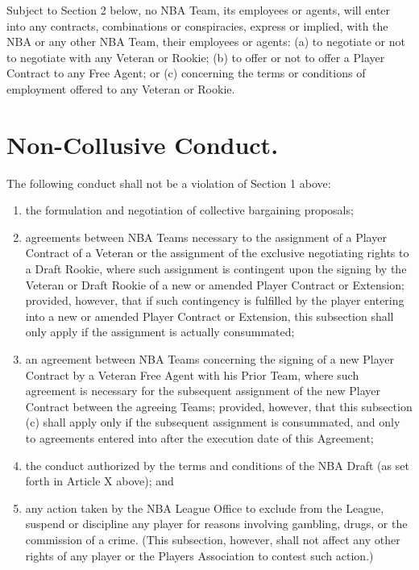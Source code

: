 \documentclass[
]{book}
\providecommand{\tightlist}{%
  \setlength{\itemsep}{0pt}\setlength{\parskip}{0pt}}
\begin{document}
Subject to Section 2 below, no NBA Team, its employees or agents, will enter into any contracts, combinations or conspiracies, express or implied, with the NBA or any other NBA Team, their employees or agents: (a) to negotiate or not to negotiate with any Veteran or Rookie; (b) to offer or not to offer a Player Contract to any Free Agent; or (c) concerning the terms or conditions of employment offered to any Veteran or Rookie.

\hypertarget{non-collusive-conduct.}{%
\section{Non-Collusive Conduct.}\label{non-collusive-conduct.}}

The following conduct shall not be a violation of Section 1 above:

\begin{enumerate}
\def\labelenumi{(\alph{enumi})}
\tightlist
\item
  the formulation and negotiation of collective bargaining proposals;
\item
  agreements between NBA Teams necessary to the assignment of a Player Contract of a Veteran or the assignment of the exclusive negotiating rights to a Draft Rookie, where such assignment is contingent upon the signing by the Veteran or Draft Rookie of a new or amended Player Contract or Extension; provided, however, that if such contingency is fulfilled by the player entering into a new or amended Player Contract or Extension, this subsection shall only apply if the assignment is actually consummated;
\item
  an agreement between NBA Teams concerning the signing of a new Player Contract by a Veteran Free Agent with his Prior Team, where such agreement is necessary for the subsequent assignment of the new Player Contract between the agreeing Teams; provided, however, that this subsection (c) shall apply only if the subsequent assignment is consummated, and only to agreements entered into after the execution date of this Agreement;
\item
  the conduct authorized by the terms and conditions of the NBA Draft (as set forth in Article X above); and
\item
  any action taken by the NBA League Office to exclude from the League, suspend or discipline any player for reasons involving gambling, drugs, or the commission of a crime. (This subsection, however, shall not affect any other rights of any player or the Players Association to contest such action.)
\end{enumerate}
\end{document}
